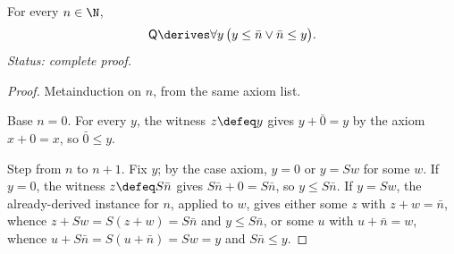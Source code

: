
\begin{lemma}
\label{lem:q-dichotomy}
For every \(n\in\N\),
\[
  \mathsf Q\derives\forall y\,
  \bigl(y\leq\bar n\lor\bar n\leq y\bigr).
\]
\textit{Status: complete proof.}
\end{lemma}

\begin{proof}
Metainduction on \(n\), from the same axiom list.

Base \(n=0\).  For every \(y\), the witness \(z\defeq y\) gives
\(y+\bar0=y\) by the axiom \(x+0=x\), so \(\bar0\leq y\).

Step from \(n\) to \(n+1\).  Fix \(y\); by the case axiom, \(y=0\) or
\(y=Sw\) for some \(w\).  If \(y=0\), the witness \(z\defeq S\bar n\)
gives \(S\bar n+0=S\bar n\), so \(y\leq S\bar n\).  If \(y=Sw\), the
already-derived instance for \(n\), applied to \(w\), gives either some
\(z\) with \(z+w=\bar n\), whence \(z+Sw=S(z+w)=S\bar n\) and
\(y\leq S\bar n\), or some \(u\) with \(u+\bar n=w\), whence
\(u+S\bar n=S(u+\bar n)=Sw=y\) and \(S\bar n\leq y\).
\end{proof}
